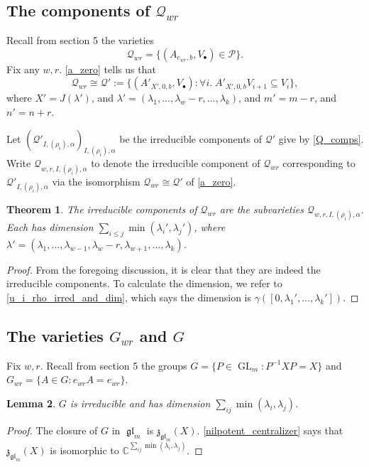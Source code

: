 \documentclass[12pt,psamsfonts]{article}
\DeclareMathOperator{\GL}{GL}
\DeclareMathOperator{\gl}{\mathfrak{gl}}
\newtheorem{theorem}{Theorem}[section]
\newtheorem{lemma}[theorem]{Lemma}
\begin{document}
\subsection{The components of \texorpdfstring{\(\mathcal{Q}_{wr}\)}{Q\_\{wr\}}}
Recall from section 5 the varieties
\[\mathcal{Q}_{wr} = \{(A_{e_{wr}, b}, V_\bullet) \in \mathcal{P}\}.\]
Fix any \(w,r\).
\cref{a_zero} tells us that 
\[\mathcal{Q}_{wr} \cong \mathcal{Q}' := \{(A'_{X', 0, b}, V_\bullet) : \forall i. \; A'_{X', 0, b} V_{i + 1} \subseteq V_i\},\]
where \(X' = J(\lambda')\), and \(\lambda' = (\lambda_1, ..., \lambda_w - r, ..., \lambda_k)\), and \(m' = m - r\), and \(n' = n + r\).
\par Let \((\mathcal{Q}'_{I, (\rho_i), \alpha})_{I, (\rho_i), \alpha}\) be the irreducible components of \(\mathcal{Q}'\) give by \cref{Q_comps}.
Write \(\mathcal{Q}_{w,r,I,(\rho_i),\alpha}\) to denote the irreducible component of \(\mathcal{Q}_{wr}\) corresponding to \(\mathcal{Q}'_{I, (\rho_i), \alpha}\) via the isomorphism \(\mathcal{Q}_{wr} \cong \mathcal{Q}'\) of \cref{a_zero}.

\begin{theorem}\label{qwr_comps}
    The irreducible components of \(\mathcal{Q}_{wr}\) are the subvarieties \(\mathcal{Q}_{w,r,I,(\rho_i),\alpha}\).
    Each has dimension \(\sum_{i \leq j} \min(\lambda_i', \lambda_j')\), where \(\lambda' = (\lambda_1, ..., \lambda_{w - 1}, \lambda_w - r, \lambda_{w + 1}, ..., \lambda_k)\).
\end{theorem}
\begin{proof}
    From the foregoing discussion, it is clear that they are indeed the irreducible components.
    To calculate the dimension, we refer to \cref{u_i_rho_irred_and_dim}, which says the dimension is \(\gamma([0, \lambda_1', ..., \lambda_k'])\).
\end{proof}

\subsection{The varieties \texorpdfstring{\(G_{wr}\)}{G\_\{wr\}} and \texorpdfstring{\(G\)}{G}}
Fix \(w,r\).
Recall from section 5 the groups \(G = \{P \in \GL_m : P^{-1}XP = X\}\) and \(G_{wr} = \{A \in G : e_{wr} A = e_{wr}\}\).
\begin{lemma}\label{g_irred_dim}
    \(G\) is irreducible and has dimension \(\sum_{ij} \min(\lambda_i, \lambda_j)\).
\end{lemma}
\begin{proof}
    The closure of \(G\) in \(\gl_m\) is \(\mathfrak{z}_{\gl_m}(X)\).
    \cref{nilpotent_centralizer} says that \(\mathfrak{z}_{\gl_m}(X)\) is isomorphic to \(\mathbb{C}^{\sum_{ij} \min(\lambda_i, \lambda_j)}\).
\end{proof}
\end{document}

